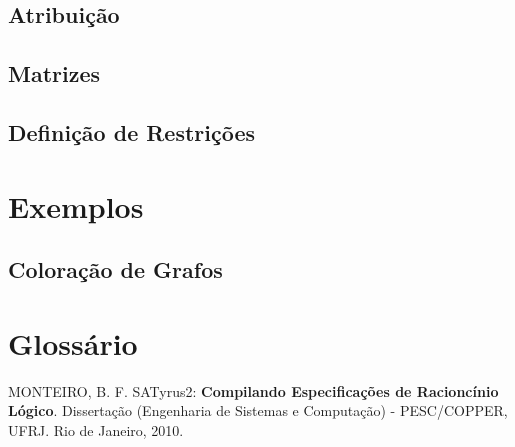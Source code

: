 \documentclass[12pt]{satyrus}
\begin{document}
    \section{Atribuição}
    
    \section{Matrizes}
    
    \section{Definição de Restrições}
    
    \chapter{Exemplos}
    
    \section{Coloração de Grafos}
    
    \chapter*{Glossário}
    
    \begin{thebibliography}{20}
    	 MONTEIRO, B. F. SATyrus2: \textbf{Compilando Especificações de Racioncínio Lógico}. Dissertação (Engenharia de Sistemas e Computação) - PESC/COPPER, UFRJ. Rio de Janeiro, 2010.
    \end{thebibliography}
    
\end{document}
